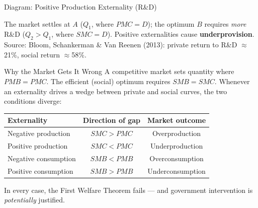 \documentclass[11pt,aspectratio=169]{beamer}
\newcommand{\srcnote}[1]{{\footnotesize\color{wugray}Source: #1}}
\begin{document}
\begin{frame}{Diagram: Positive Production Externality (R\&D)}
  \begin{center}
  \end{center}
  \footnotesize The market settles at $A$ ($Q_1$, where $PMC=D$); the optimum $B$ requires \emph{more} R\&D ($Q_2>Q_1$, where $SMC=D$). Positive externalities cause \textbf{underprovision}.\\
  \srcnote{Bloom, Schankerman \& Van Reenen (2013): private return to R\&D $\approx$21\%, social return $\approx$58\%.}
\end{frame}

\begin{frame}{Why the Market Gets It Wrong}
  A competitive market sets quantity where \(PMB = PMC\). The efficient (social) optimum requires \(SMB = SMC\). Whenever an externality drives a wedge between private and social curves, the two conditions diverge:
  \begin{center}
  \begin{tabular}{@{}lcc@{}}
    \toprule
    \textbf{Externality} & \textbf{Direction of gap} & \textbf{Market outcome} \\
    \midrule
    Negative production & $SMC>PMC$ & Overproduction \\
    Positive production & $SMC<PMC$ & Underproduction \\
    Negative consumption & $SMB<PMB$ & Overconsumption \\
    Positive consumption & $SMB>PMB$ & Underconsumption \\
    \bottomrule
  \end{tabular}
  \end{center}
  \vspace{0.5em}
  In every case, the First Welfare Theorem fails --- and government intervention is \emph{potentially} justified.
\end{frame}
\end{document}
